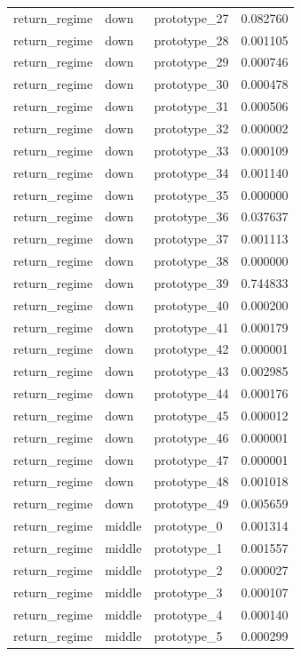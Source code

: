 \begin{tabular}{lllr}
return\_regime & down & prototype\_27 & 0.082760 \\
return\_regime & down & prototype\_28 & 0.001105 \\
return\_regime & down & prototype\_29 & 0.000746 \\
return\_regime & down & prototype\_30 & 0.000478 \\
return\_regime & down & prototype\_31 & 0.000506 \\
return\_regime & down & prototype\_32 & 0.000002 \\
return\_regime & down & prototype\_33 & 0.000109 \\
return\_regime & down & prototype\_34 & 0.001140 \\
return\_regime & down & prototype\_35 & 0.000000 \\
return\_regime & down & prototype\_36 & 0.037637 \\
return\_regime & down & prototype\_37 & 0.001113 \\
return\_regime & down & prototype\_38 & 0.000000 \\
return\_regime & down & prototype\_39 & 0.744833 \\
return\_regime & down & prototype\_40 & 0.000200 \\
return\_regime & down & prototype\_41 & 0.000179 \\
return\_regime & down & prototype\_42 & 0.000001 \\
return\_regime & down & prototype\_43 & 0.002985 \\
return\_regime & down & prototype\_44 & 0.000176 \\
return\_regime & down & prototype\_45 & 0.000012 \\
return\_regime & down & prototype\_46 & 0.000001 \\
return\_regime & down & prototype\_47 & 0.000001 \\
return\_regime & down & prototype\_48 & 0.001018 \\
return\_regime & down & prototype\_49 & 0.005659 \\
return\_regime & middle & prototype\_0 & 0.001314 \\
return\_regime & middle & prototype\_1 & 0.001557 \\
return\_regime & middle & prototype\_2 & 0.000027 \\
return\_regime & middle & prototype\_3 & 0.000107 \\
return\_regime & middle & prototype\_4 & 0.000140 \\
return\_regime & middle & prototype\_5 & 0.000299 \\

\end{tabular}
